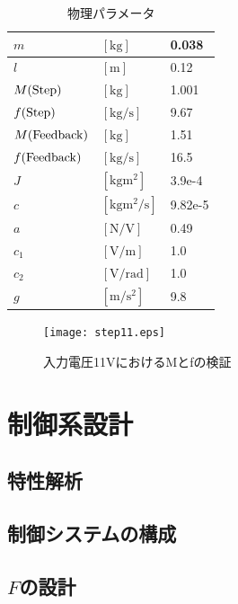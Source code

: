 \documentclass[a4j,11pt,twoside]{jbook}
\begin{document}
\begin{table}[hbtp]
	\begin{center}
		\caption{物理パラメータ}
		\medskip
		\begin{tabular}{|ll|l|} \hline
			$m$ & $[\mathrm{kg}]$ & 0.038 \\ \hline
			$l$ & $[\mathrm{m}]$ & 0.12 \\ \hline
			$M(\rm{Step})$ & $[\mathrm{kg}]$ & 1.001 \\ \hline
			$f(\rm{Step})$ & $[\mathrm{kg/s}]$ & 9.67 \\ \hline
			$M(\rm{Feedback})$ & $[\mathrm{kg}]$ & 1.51 \\ \hline
			$f(\rm{Feedback})$ & $[\mathrm{kg/s}]$ & 16.5 \\ \hline
			$J$ & $[\mathrm{kgm^2}]$ & 3.9e-4 \\ \hline
			$c$ & $[\mathrm{kgm^2/s}]$ & 9.82e-5 \\ \hline
			$a$ & $[\mathrm{N/V}]$ & 0.49 \\ \hline
			$c_1$ & $[\mathrm{V/m}]$ & 1.0 \\ \hline
			$c_2$ & $[\mathrm{V/rad}]$ & 1.0 \\ \hline
			$g$ & $[\mathrm{m/s^2}]$ & 9.8 \\ \hline
		\end{tabular}
	\end{center}
\end{table}

\begin{figure}[htbp]
	\begin{center}
		\texttt{[image: step11.eps]}
		\caption{入力電圧11VにおけるMとfの検証}
		\label{fig:入力電圧11VにおけるMとfの検証}
	\end{center}
\end{figure}

\chapter{制御系設計}
\begin{figure}

\end{figure}
\section{特性解析}
\section{制御システムの構成}
\section{$F$の設計}
\end{document}
